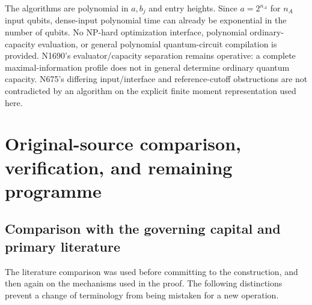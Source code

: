\documentclass[11pt,a4paper]{article}
\theoremstyle{definition}\newtheorem{definition}[theorem]{Definition}
\begin{document}
The algorithms are polynomial in $a,b_j$ and entry heights. Since $a=2^{n_A}$ for $n_A$ input qubits, dense-input polynomial time can already be exponential in the number of qubits. No NP-hard optimization interface, polynomial ordinary-capacity evaluation, or general polynomial quantum-circuit compilation is provided. N1690's evaluator/capacity separation remains operative: a complete maximal-information profile does not in general determine ordinary quantum capacity. N675's differing input/interface and reference-cutoff obstructions are not contradicted by an algorithm on the explicit finite moment representation used here.

\section{Original-source comparison, verification, and remaining programme}

\subsection{Comparison with the governing capital and primary literature}

The literature comparison was used before committing to the construction, and then again on the mechanisms used in the proof. The following distinctions prevent a change of terminology from being mistaken for a new operation.
\end{document}
